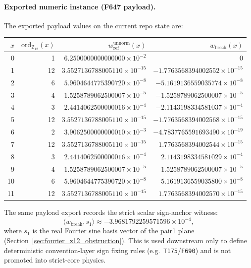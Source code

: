 \documentclass[11pt,a4paper]{article}
\begin{document}
\paragraph{Exported numeric instance (F647 payload).}
The exported payload values on the current repo state are:
\begin{center}
\begin{tabular}{rrrr}
\toprule
$x$ & $\mathrm{ord}_{\mathbb{Z}_{12}}(x)$ & $w_{\mathrm{ref}}^{\mathrm{unnorm}}(x)$ & $w_{\mathrm{break}}(x)$\\
\midrule
0 & 1  & $6.2500000000000000{\times}10^{-2}$ & $0$\\
1 & 12 & $3.5527136788005110{\times}10^{-15}$ & $-1.7763568394002552{\times}10^{-15}$\\
2 & 6  & $5.9604644775390720{\times}10^{-8}$ & $-5.1619136559035774{\times}10^{-8}$\\
3 & 4  & $1.5258789062500007{\times}10^{-5}$ & $-1.5258789062500007{\times}10^{-5}$\\
4 & 3  & $2.4414062500000016{\times}10^{-4}$ & $-2.1143198334581037{\times}10^{-4}$\\
5 & 12 & $3.5527136788005110{\times}10^{-15}$ & $-1.7763568394002568{\times}10^{-15}$\\
6 & 2  & $3.9062500000000010{\times}10^{-3}$ & $-4.7837765591693490{\times}10^{-19}$\\
7 & 12 & $3.5527136788005110{\times}10^{-15}$ & $1.7763568394002544{\times}10^{-15}$\\
8 & 3  & $2.4414062500000016{\times}10^{-4}$ & $2.1143198334581029{\times}10^{-4}$\\
9 & 4  & $1.5258789062500007{\times}10^{-5}$ & $1.5258789062500007{\times}10^{-5}$\\
10 & 6 & $5.9604644775390720{\times}10^{-8}$ & $5.1619136559035800{\times}10^{-8}$\\
11 & 12 & $3.5527136788005110{\times}10^{-15}$ & $1.7763568394002570{\times}10^{-15}$\\
\bottomrule
\end{tabular}
\end{center}

The same payload export records the strict scalar sign-anchor witness:
\[
\langle w_{\mathrm{break}}, s_1\rangle \approx -3.9681792259571596\times 10^{-4},
\]
where $s_1$ is the real Fourier sine basis vector of the pair1 plane (Section~\ref{sec:fourier_z12_obstruction}).
This is used downstream only to define deterministic convention-layer sign fixing rules (e.g.\ \texttt{T175}/\texttt{F690}) and is not promoted into strict-core physics.
\end{document}
